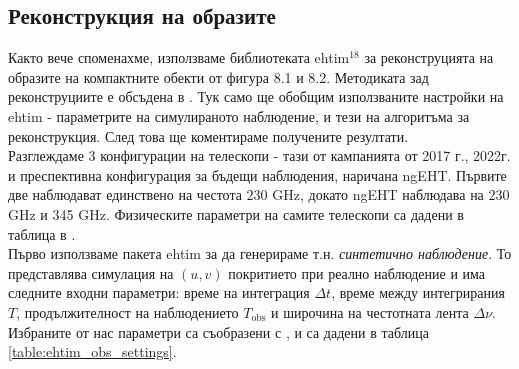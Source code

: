 \subsection{Реконструкция на образите}

Както вече споменахме, използваме библиотеката ehtim$^{18}$ за реконструцията на образите на компактните обекти от фигура 8.1 и 8.2. Методиката зад реконструциите е обсъдена в \cite{EHTIM}. Тук само ще обобщим използваните настройки на ehtim - параметрите на симулираното наблюдение, и тези на алгоритъма за реконструкция. След това ще коментираме получените резултати.\\

Разглеждаме 3 конфигурации на телескопи - тази от кампанията от 2017 г., 2022г. и преспективна конфигурация за бъдещи наблюдения, наричана ngEHT. Първите две наблюдават единствено на честота $230$ GHz, докато ngEHT наблюдава на $230$ GHz и 345 GHz. Физическите параметри на самите телескопи са дадени в таблица в \cite{Deliyski2024}. \\

Първо използваме пакета ehtim за да генерираме т.н. \emph{синтетично наблюдение}. То представлява симулация на $(u,v)$ покритието при реално наблюдение и има следните входни параметри: време на интеграция $\Delta t$, време между интегрирания $T$, продължителност на наблюдението $T_\text{obs}$ и широчина на честотната лента $\Delta\nu$. Избраните от нас параметри са съобразени с \cite{EHTIM}, и са дадени в таблица \ref{table:ehtim_obs_settings}.\\

